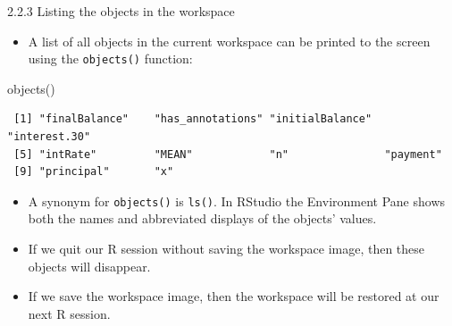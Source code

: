 \documentclass[
  9pt,
  a4paper,
  ignorenonframetext,
  notheorems]{beamer}
\newenvironment{Shaded}{\begin{snugshade}}{\end{snugshade}}
\newcommand{\FunctionTok}[1]{\textcolor[rgb]{0.28,0.35,0.67}{#1}}
\newcommand{\NormalTok}[1]{\textcolor[rgb]{0.00,0.23,0.31}{#1}}
\providecommand{\tightlist}{%
  \setlength{\itemsep}{0pt}\setlength{\parskip}{0pt}}\usepackage{longtable,booktabs,array}
\begin{document}
\begin{frame}[fragile]{2.2.3 Listing the objects in the workspace}
\protect\hypertarget{listing-the-objects-in-the-workspace}{}
\begin{itemize}
\tightlist
\item
  A list of all objects in the current workspace can be printed to the
  screen using the \texttt{objects()} function:
\end{itemize}

\begin{Shaded}
\begin{Highlighting}[]
\FunctionTok{objects}\NormalTok{()}
\end{Highlighting}
\end{Shaded}

\begin{verbatim}
 [1] "finalBalance"    "has_annotations" "initialBalance"  "interest.30"    
 [5] "intRate"         "MEAN"            "n"               "payment"        
 [9] "principal"       "x"              
\end{verbatim}

\begin{itemize}
\item
  A synonym for \texttt{objects()} is \texttt{ls()}. In RStudio the
  Environment Pane shows both the names and abbreviated displays of the
  objects' values.
\item
  If we quit our R session without saving the workspace image, then
  these objects will disappear.
\item
  If we save the workspace image, then the workspace will be restored at
  our next R session.
\end{itemize}
\end{frame}
\end{document}
